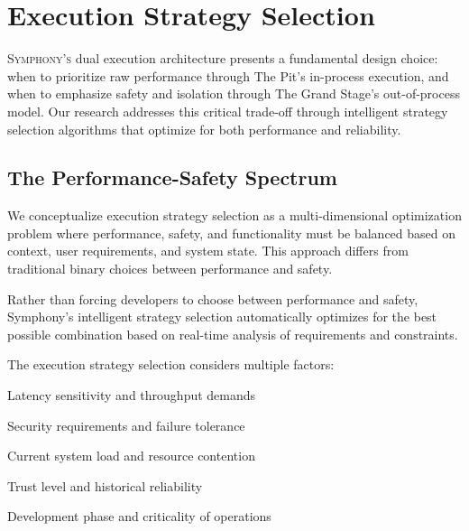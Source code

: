 
\section*{Execution Strategy Selection}

\lettrine{S}{ymphony's} dual execution architecture presents a fundamental design choice: when to prioritize raw performance through The Pit's in-process execution, and when to emphasize safety and isolation through The Grand Stage's out-of-process model. Our research addresses this critical trade-off through intelligent strategy selection algorithms that optimize for both performance and reliability.

\subsection*{The Performance-Safety Spectrum}

We conceptualize execution strategy selection as a multi-dimensional optimization problem where performance, safety, and functionality must be balanced based on context, user requirements, and system state. This approach differs from traditional binary choices between performance and safety.

\begin{infobox}[title=Execution Strategy Philosophy]
Rather than forcing developers to choose between performance and safety, Symphony's intelligent strategy selection automatically optimizes for the best possible combination based on real-time analysis of requirements and constraints.
\end{infobox}

The execution strategy selection considers multiple factors:

\begin{description}[leftmargin=4cm,labelwidth=3.5cm]
    \item[\textbf{Performance Requirements}] Latency sensitivity and throughput demands
    \item[\textbf{Safety Constraints}] Security requirements and failure tolerance
    \item[\textbf{Resource Availability}] Current system load and resource contention
    \item[\textbf{Extension Characteristics}] Trust level and historical reliability
    \item[\textbf{User Context}] Development phase and criticality of operations
\end{description}

